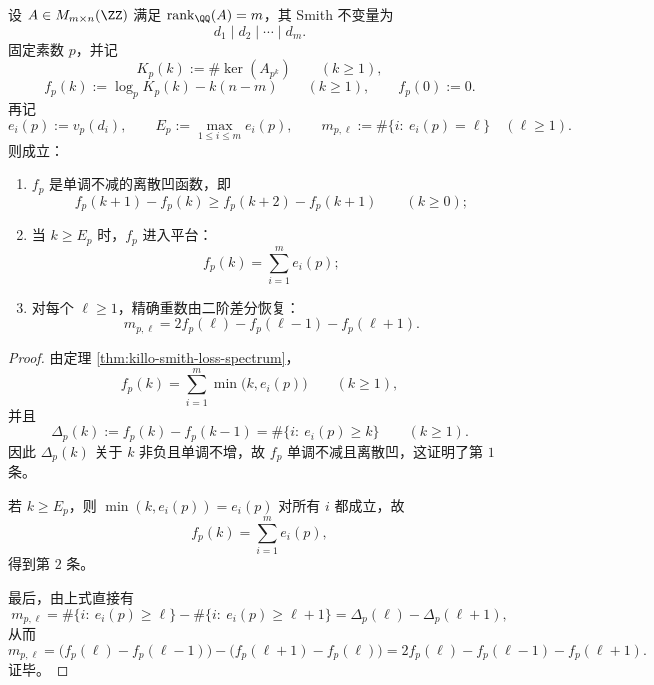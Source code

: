 \begin{corollary}\label{cor:xi-smith-kernel-spectrum-discrete-concavity-plateau-inversion}
设 \(A\in M_{m\times n}(\ZZ)\) 满足 \(\operatorname{rank}_{\QQ}(A)=m\)，其 Smith 不变量为
\[
d_1\mid d_2\mid\cdots\mid d_m.
\]
固定素数 \(p\)，并记
\[
K_p(k):=\#\ker(A_{p^k})
\qquad(k\ge 1),
\]
\[
f_p(k):=\log_p K_p(k)-k(n-m)
\qquad(k\ge 1),
\qquad
f_p(0):=0.
\]
再记
\[
e_i(p):=v_p(d_i),
\qquad
E_p:=\max_{1\le i\le m}e_i(p),
\qquad
m_{p,\ell}:=\#\{i:\ e_i(p)=\ell\}
\quad(\ell\ge 1).
\]
则成立：
\begin{enumerate}
  \item \(f_p\) 是单调不减的离散凹函数，即
  \[
  f_p(k+1)-f_p(k)\ge f_p(k+2)-f_p(k+1)
  \qquad(k\ge 0);
  \]
  \item 当 \(k\ge E_p\) 时，\(f_p\) 进入平台：
  \[
  f_p(k)=\sum_{i=1}^{m}e_i(p);
  \]
  \item 对每个 \(\ell\ge 1\)，精确重数由二阶差分恢复：
  \[
  m_{p,\ell}
  =
  2f_p(\ell)-f_p(\ell-1)-f_p(\ell+1).
  \]
\end{enumerate}
\end{corollary}
\begin{proof}
由定理 \ref{thm:killo-smith-loss-spectrum}，
\[
f_p(k)=\sum_{i=1}^{m}\min\bigl(k,e_i(p)\bigr)
\qquad(k\ge 1),
\]
并且
\[
\Delta_p(k):=f_p(k)-f_p(k-1)=\#\{i:\ e_i(p)\ge k\}
\qquad(k\ge 1).
\]
因此 \(\Delta_p(k)\) 关于 \(k\) 非负且单调不增，故 \(f_p\) 单调不减且离散凹，这证明了第 \(1\) 条。

若 \(k\ge E_p\)，则 \(\min(k,e_i(p))=e_i(p)\) 对所有 \(i\) 都成立，故
\[
f_p(k)=\sum_{i=1}^{m}e_i(p),
\]
得到第 \(2\) 条。

最后，由上式直接有
\[
m_{p,\ell}
=
\#\{i:\ e_i(p)\ge \ell\}-\#\{i:\ e_i(p)\ge \ell+1\}
=
\Delta_p(\ell)-\Delta_p(\ell+1),
\]
从而
\[
m_{p,\ell}
=
\bigl(f_p(\ell)-f_p(\ell-1)\bigr)-\bigl(f_p(\ell+1)-f_p(\ell)\bigr)
=
2f_p(\ell)-f_p(\ell-1)-f_p(\ell+1).
\]
证毕。
\end{proof}

